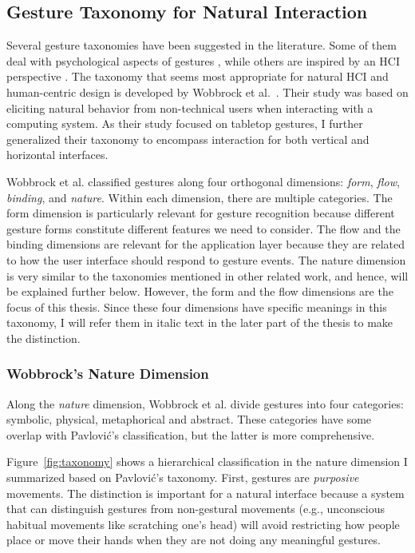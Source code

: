\subsection{Gesture Taxonomy for Natural Interaction}\label{sec:taxonomy}
Several gesture taxonomies have been suggested in the literature. Some of them
deal with psychological aspects of gestures \cite{kendon86, mcneill82}, while
others are inspired by an HCI perspective \cite{Pavlovic97, quek95, wobbrock09}. 
The taxonomy that seems most appropriate for natural HCI and human-centric
design is developed by Wobbrock et al.~\cite{wobbrock09}. Their study was based
on eliciting natural behavior from non-technical users when interacting with a computing system.
As their study focused on tabletop gestures, I further generalized their
taxonomy to encompass interaction for both vertical and horizontal interfaces.

Wobbrock et al. \cite{wobbrock09} classified gestures along four
orthogonal dimensions: \textit{form},
\textit{flow}, \textit{binding}, and \textit{nature}. Within each
dimension, there are multiple categories. The form dimension is
particularly relevant for gesture recognition because different gesture forms constitute different features we need to consider. The flow and the
binding dimensions are relevant for the application layer because they
are related to how the user interface should respond to gesture events. The
nature dimension is very similar to the taxonomies mentioned in other
related work, and hence, will be explained further below. However, the
form and the flow dimensions are the focus of this thesis. Since these four dimensions have
specific meanings in this taxonomy, I will refer them in italic text in the
later part of the thesis to make the distinction.

\subsubsection{Wobbrock's Nature Dimension}
Along the \textit{nature} dimension, Wobbrock et al. divide gestures into four
categories: symbolic, physical, metaphorical and abstract. These
categories have some overlap with Pavlovi\'{c}'s classification, but the latter
is more comprehensive.

Figure~\ref{fig:taxonomy} shows a hierarchical classification in the
nature dimension I summarized based on Pavlovi\'{c}'s taxonomy. First,
gestures are \textit{purposive} movements. The distinction is important for a natural interface because a
system that can distinguish gestures from non-gestural movements (e.g.,
unconscious habitual movements like scratching one's head) will avoid
restricting how people place or move their hands when they are not doing any meaningful gestures.


